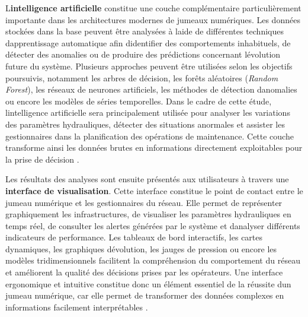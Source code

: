 \documentclass[12pt,a4paper,oneside]{report}
\begin{document}
L\textquotesingle{}\textbf{intelligence artificielle} constitue une
couche complémentaire particulièrement importante dans les architectures
modernes de jumeaux numériques. Les données stockées dans la base
peuvent être analysées à l\textquotesingle aide de différentes
techniques d\textquotesingle apprentissage automatique afin
d\textquotesingle identifier des comportements inhabituels, de détecter
des anomalies ou de produire des prédictions concernant
l\textquotesingle évolution future du système. Plusieurs approches
peuvent être utilisées selon les objectifs poursuivis, notamment les
arbres de décision, les forêts aléatoires (\emph{Random Forest}), les
réseaux de neurones artificiels, les méthodes de détection
d\textquotesingle anomalies ou encore les modèles de séries temporelles.
Dans le cadre de cette étude, l\textquotesingle intelligence
artificielle sera principalement utilisée pour analyser les variations
des paramètres hydrauliques, détecter des situations anormales et
assister les gestionnaires dans la planification des opérations de
maintenance. Cette couche transforme ainsi les données brutes en
informations directement exploitables pour la prise de décision
\cite{ref61}.

Les résultats des analyses sont ensuite présentés aux utilisateurs à
travers une \textbf{interface de visualisation}. Cette interface
constitue le point de contact entre le jumeau numérique et les
gestionnaires du réseau. Elle permet de représenter graphiquement les
infrastructures, de visualiser les paramètres hydrauliques en temps
réel, de consulter les alertes générées par le système et
d\textquotesingle analyser différents indicateurs de performance. Les
tableaux de bord interactifs, les cartes dynamiques, les graphiques
d\textquotesingle évolution, les jauges de pression ou encore les
modèles tridimensionnels facilitent la compréhension du comportement du
réseau et améliorent la qualité des décisions prises par les opérateurs.
Une interface ergonomique et intuitive constitue donc un élément
essentiel de la réussite d\textquotesingle un jumeau numérique, car elle
permet de transformer des données complexes en informations facilement
interprétables \cite{ref17}.
\end{document}
